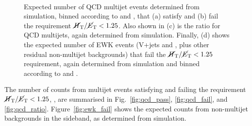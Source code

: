 \begin{figure}[!h]
{   %
  } \\
  \caption{Expected number of QCD multijet events determined from
    simulation, binned according to \njet and \scalht, that (a) satisfy
    and (b) fail the requirement $\mbox{$\mbox{$\cancel{H}_\text{T}$} / \mbox{$\cancel{E}_\text{T}$}$} < 1.25$. Also shown in (c)
    is the ratio \rmhtmet for QCD multijets, again determined from
    simulation. Finally, (d) shows the expected number of EWK events
    (V+jets and \ttbar, plus other residual non-multijet backgrounds)
    that fail the $\mbox{$\mbox{$\cancel{H}_\text{T}$} / \mbox{$\cancel{E}_\text{T}$}$} < 1.25$ requirement, again determined from
    simulation and binned according to \njet and \scalht.}
  \label{fig:qcd_plots}
\end{figure}

The number of counts from \QCD multijet events satisfying and failing the
requirement $\mbox{$\mbox{$\cancel{H}_\text{T}$} / \mbox{$\cancel{E}_\text{T}$}$} < 1.25$, \rmhtmet, are
summarised in Fig.~\ref{fig:qcd_pass}, \ref{fig:qcd_fail}, and
\ref{fig:qcd_ratio}. Figure~\ref{fig:ewk_fail} shows the expected
counts from non-multijet backgrounds in the \mhtmet sideband, as
determined from simulation.


